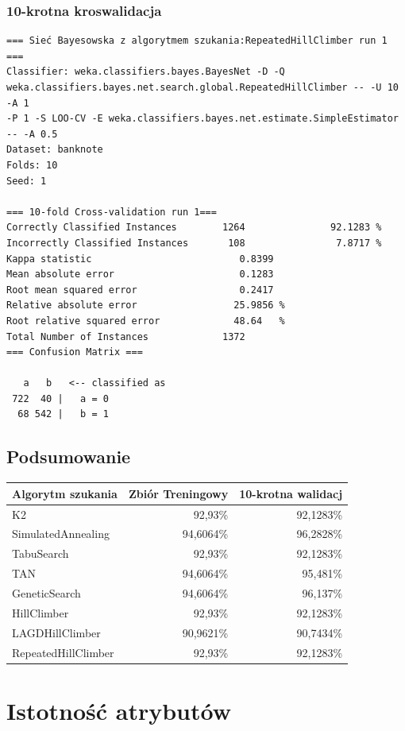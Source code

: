 \documentclass{classrep}
\begin{document}
\subsubsection*{10-krotna kroswalidacja}
\scriptsize 
\begin{verbatim}
=== Sieć Bayesowska z algorytmem szukania:RepeatedHillClimber run 1 ===
Classifier: weka.classifiers.bayes.BayesNet -D -Q
weka.classifiers.bayes.net.search.global.RepeatedHillClimber -- -U 10 -A 1
-P 1 -S LOO-CV -E weka.classifiers.bayes.net.estimate.SimpleEstimator -- -A 0.5
Dataset: banknote
Folds: 10
Seed: 1

=== 10-fold Cross-validation run 1===
Correctly Classified Instances        1264               92.1283 %
Incorrectly Classified Instances       108                7.8717 %
Kappa statistic                          0.8399
Mean absolute error                      0.1283
Root mean squared error                  0.2417
Relative absolute error                 25.9856 %
Root relative squared error             48.64   %
Total Number of Instances             1372     
=== Confusion Matrix ===

   a   b   <-- classified as
 722  40 |   a = 0
  68 542 |   b = 1
\end{verbatim} 
\normalsize

\subsection{Podsumowanie}
\begin{tabular}{|l|r|r|}
  \hline 
  Algorytm szukania & Zbiór Treningowy & 10-krotna walidacj \\
  \hline
  K2 & 92,93\% & 92,1283\% \\
  \hline
  SimulatedAnnealing & 94,6064\% & 96,2828\% \\
  \hline
  TabuSearch & 92,93\% & 92,1283\% \\
  \hline
  TAN & 94,6064\% & 95,481\% \\
  \hline
  GeneticSearch & 94,6064\% & 96,137\% \\ 
  \hline
  HillClimber & 92,93\% & 92,1283\% \\
  \hline
  LAGDHillClimber & 90,9621\% & 90,7434\% \\
  \hline
  RepeatedHillClimber & 92,93\% & 92,1283\% \\
  \hline

\end{tabular} 

 

\section{Istotność atrybutów}
\end{document}
